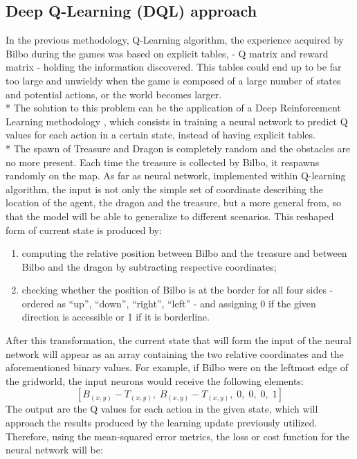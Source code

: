 \subsection{Deep Q-Learning (DQL) approach}
In the previous methodology, Q-Learning algorithm, the experience acquired by Bilbo during the games was based on explicit tables, - Q matrix and reward matrix - holding the information discovered. This tables could end up to be far too large and unwieldy when the game is composed of a large number of states and potential actions, or the world becomes larger.\\*
The solution to this problem can be the application of a Deep Reinforcement Learning methodology \cite{3,6}, which consists in training a neural network to predict Q values for each action in a certain state, instead of having explicit tables.\\*
The spawn of Treasure and Dragon is completely random and the obstacles are no more present.
Each time the treasure is collected by Bilbo, it respawns randomly on the map.
As far as neural network, implemented within Q-learning algorithm, the input is not only the simple set of coordinate describing the location of the agent, the dragon and the treasure, but a more general from, so that the model will be able to generalize to different scenarios. This reshaped form of current state is produced by:
\begin{enumerate}[noitemsep, topsep=0ex]
  \item computing the relative position between Bilbo and the treasure and between Bilbo and the dragon by subtracting respective coordinates;
  \item checking whether the position of Bilbo is at the border for all four sides - ordered as ``up'', ``down'', ``right'', ``left'' - and assigning 0 if the given direction is accessible or 1 if it is borderline.
\end{enumerate}
After this transformation, the current state that will form the input of the neural network will appear as an array containing the two relative coordinates and the aforementioned binary values. For example, if Bilbo were on the leftmost edge of the gridworld, the input neurons would receive the following elements:
$$
[B_{(x,y)}-T_{(x,y)},\;B_{(x,y)}-T_{(x,y)},\;0,\;0,\;0,\;1]
$$
The output are the Q values for each action in the given state, which will approach the results produced by the learning update previously utilized. Therefore, using the mean-squared error metrics, the loss or cost function for the neural network will be:
